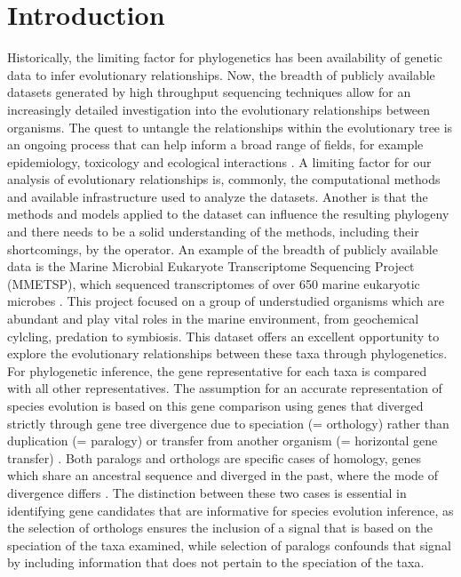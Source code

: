 \documentclass[12pt]{article}
\begin{document}
\section{Introduction}
Historically, the limiting factor for phylogenetics has been availability of genetic data to infer evolutionary relationships.
Now, the breadth of publicly available datasets generated by high throughput sequencing techniques allow for an increasingly detailed investigation into the evolutionary relationships between organisms.
The quest to untangle the relationships within the evolutionary tree is an ongoing process that can help inform a broad range of fields, for example epidemiology, toxicology and ecological interactions \cite{mctavish2017and}.
A limiting factor for our analysis of evolutionary relationships is, commonly, the computational methods and available infrastructure used to analyze the datasets. 
Another is that the methods and models applied to the dataset can influence the resulting phylogeny and there needs to be a solid understanding of the methods, including their shortcomings, by the operator.
An example of the breadth of publicly available data is the Marine Microbial Eukaryote Transcriptome Sequencing Project (MMETSP), which sequenced transcriptomes of over 650 marine eukaryotic microbes \cite{keeling2014marine}. 
This project focused on a group of understudied organisms which are abundant and play vital roles in the marine environment, from geochemical cylcling, predation to symbiosis. %
This dataset offers an excellent opportunity to explore the evolutionary relationships between these taxa through phylogenetics. 
For phylogenetic inference, the gene representative for each taxa is compared with all other representatives. 
The assumption for an accurate representation of species evolution is based on this gene comparison using genes that diverged strictly through  gene tree divergence due to speciation (= orthology) rather than duplication (= paralogy) or transfer from another organism (= horizontal gene transfer) \cite{maddison1997gene}. 
Both paralogs and orthologs are specific cases of homology, genes which share an ancestral sequence and diverged in the past, where the mode of divergence differs \cite{fitch1970distinguishing}. 
The distinction between these two cases is essential in identifying gene candidates that are informative for species evolution inference, as the selection of orthologs ensures the inclusion of a signal that is based on the speciation of the taxa examined, while selection of paralogs confounds that signal by including information that does not pertain to the speciation of the taxa. 
\end{document}
